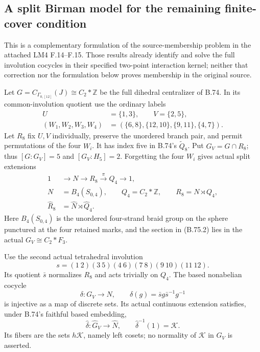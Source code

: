 \subsection*{A split Birman model for the remaining finite-cover condition}

This is a complementary formulation of the source-membership problem
in the attached LM4 F.14--F.15.  Those results already identify and
solve the full involution cocycles in their specified two-point
interaction kernel; neither that correction nor the formulation below
proves membership in the original source.

Let \(G=C_{\Gamma_{0,[12]}}(J)\cong C_2*\mathbb Z\) be the full
dihedral centralizer of B.74.  In its common-involution quotient use
the ordinary labels
\[
\begin{split}
 U&=\{1,3\},\qquad V=\{2,5\},\\
 (W_1,W_2,W_3,W_4)&=(\{6,8\},\{12,10\},\{9,11\},\{4,7\}).
\end{split}                                                    \tag{B.75.1}
\]
Let \(R_8\) fix \(U,V\) individually, preserve the unordered
branch pair, and permit permutations of the four \(W_i\).
It has index five in B.74's \(\widetilde Q_8\).
Put \(G_V=G\cap R_8\); thus \([G:G_V]=5\) and
\([G_V:H_5]=2\).
Forgetting the four \(W_i\) gives actual split extensions
\[
\begin{split}
 1&\longrightarrow N\longrightarrow R_8
       \xrightarrow{\pi}Q_4\longrightarrow1,\\
 N&=B_4(S_{0,4}),\qquad Q_4=C_2*\mathbb Z,\qquad
 R_8=N\rtimes Q_4,\\
 \widehat R_8&=\widehat N\rtimes\widehat Q_4.
\end{split}                                                    \tag{B.75.2}
\]
Here \(B_4(S_{0,4})\) is the unordered four-strand braid group
on the sphere punctured at the four retained marks, and the
section in (B.75.2) lies in the actual \(G_V\cong C_2*F_3\).

Use the second actual tetrahedral involution
\[
       s=(1\ 2)(3\ 5)(4\ 6)(7\ 8)(9\ 10)(11\ 12).
                                                               \tag{B.75.3}
\]
Its quotient \(\bar s\) normalizes \(R_8\) and acts trivially
on \(Q_4\).  The based nonabelian cocycle
\[
 \delta:G_V\longrightarrow N,\qquad
       \delta(g)=\bar s g\bar s^{-1}g^{-1}
                                                               \tag{B.75.4}
\]
is injective as a map of discrete sets.  Its actual continuous
extension satisfies, under B.74's faithful based embedding,
\[
 \widehat\delta:\widehat G_V\longrightarrow\widehat N,
       \qquad \widehat\delta^{-1}(1)=\mathcal K.
                                                               \tag{B.75.5}
\]
Its fibers are the sets \(h\mathcal K\), namely left cosets;
no normality of \(\mathcal K\) in \(\widehat G_V\) is asserted.

